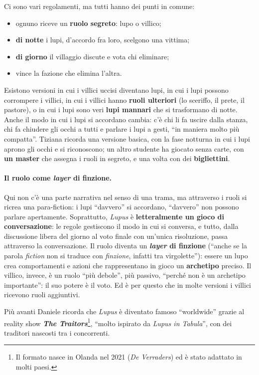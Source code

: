 Ci sono vari regolamenti, ma tutti hanno dei punti in comune:
\begin{itemize}
  \item ognuno riceve un \textbf{ruolo segreto}: lupo o villico;
  \item \textbf{di notte} i lupi, d'accordo fra loro, scelgono una vittima;
  \item \textbf{di giorno} il villaggio discute e vota chi eliminare;
  \item vince la fazione che elimina l'altra.
\end{itemize}
Esistono versioni in cui i villici uccisi diventano lupi, in cui i lupi possono corrompere i
villici, in cui i villici hanno \textbf{ruoli ulteriori} (lo sceriffo, il prete, il pastore),
o in cui i lupi sono veri \textbf{lupi mannari} che si trasformano di notte. Anche il modo in
cui i lupi si accordano cambia: c'è chi li fa uscire dalla stanza, chi fa chiudere gli occhi a
tutti e parlare i lupi a gesti, ``in maniera molto più compatta''. Tiziana ricorda una versione
basica, con la fase notturna in cui i lupi aprono gli occhi e si riconoscono; un altro studente
ha giocato senza carte, con \textbf{un master} che assegna i ruoli in segreto, e una volta con
dei \textbf{bigliettini}.

\paragraph{Il ruolo come \emph{layer} di finzione.} Qui non c'è una parte narrativa nel senso di
una trama, ma attraverso i ruoli si ricrea una para-fiction: i lupi ``davvero'' si accordano,
``davvero'' non possono parlare apertamente. Soprattutto, \emph{Lupus} è \textbf{letteralmente
un gioco di conversazione}: le regole gestiscono il modo in cui si conversa, e tutto, dalla
discussione libera del giorno al voto finale con un'unica risoluzione, passa attraverso la
conversazione. Il ruolo diventa un \textbf{\emph{layer} di finzione} (``anche se la parola
\emph{fiction} non si traduce con \emph{finzione}, infatti tra virgolette''): essere un lupo
crea comportamenti e azioni che rappresentano in gioco un \textbf{archetipo} preciso. Il
villico, invece, è un ruolo ``più debole'', più passivo, ``perché non è un archetipo
importante'': il suo potere è il voto. Ed è per questo che in molte versioni i villici ricevono
ruoli aggiuntivi.

Più avanti Daniele ricorda che \emph{Lupus} è diventato famoso ``worldwide'' grazie al reality
show \textbf{\emph{The Traitors}}\footnote{Il formato nasce in Olanda nel 2021 (\emph{De
Verraders}) ed è stato adattato in molti paesi.}, ``molto ispirato da \emph{Lupus in Tabula}'',
con dei traditori nascosti tra i concorrenti.

